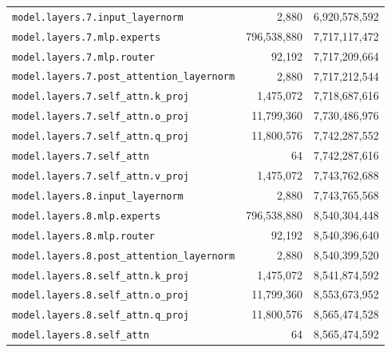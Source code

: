 \documentclass[10pt,a4paper]{article}
\theoremstyle{definition}
\begin{document}
\begin{appendices}
\begin{longtable}{p{9.5cm}rr}
\texttt{model.\allowbreak{}layers.\allowbreak{}7.\allowbreak{}input\_layernorm} & 2,880 & 6,920,578,592 \\
\texttt{model.\allowbreak{}layers.\allowbreak{}7.\allowbreak{}mlp.\allowbreak{}experts} & 796,538,880 & 7,717,117,472 \\
\texttt{model.\allowbreak{}layers.\allowbreak{}7.\allowbreak{}mlp.\allowbreak{}router} & 92,192 & 7,717,209,664 \\
\texttt{model.\allowbreak{}layers.\allowbreak{}7.\allowbreak{}post\_attention\_layernorm} & 2,880 & 7,717,212,544 \\
\texttt{model.\allowbreak{}layers.\allowbreak{}7.\allowbreak{}self\_attn.\allowbreak{}k\_proj} & 1,475,072 & 7,718,687,616 \\
\texttt{model.\allowbreak{}layers.\allowbreak{}7.\allowbreak{}self\_attn.\allowbreak{}o\_proj} & 11,799,360 & 7,730,486,976 \\
\texttt{model.\allowbreak{}layers.\allowbreak{}7.\allowbreak{}self\_attn.\allowbreak{}q\_proj} & 11,800,576 & 7,742,287,552 \\
\texttt{model.\allowbreak{}layers.\allowbreak{}7.\allowbreak{}self\_attn} & 64 & 7,742,287,616 \\
\texttt{model.\allowbreak{}layers.\allowbreak{}7.\allowbreak{}self\_attn.\allowbreak{}v\_proj} & 1,475,072 & 7,743,762,688 \\
\texttt{model.\allowbreak{}layers.\allowbreak{}8.\allowbreak{}input\_layernorm} & 2,880 & 7,743,765,568 \\
\texttt{model.\allowbreak{}layers.\allowbreak{}8.\allowbreak{}mlp.\allowbreak{}experts} & 796,538,880 & 8,540,304,448 \\
\texttt{model.\allowbreak{}layers.\allowbreak{}8.\allowbreak{}mlp.\allowbreak{}router} & 92,192 & 8,540,396,640 \\
\texttt{model.\allowbreak{}layers.\allowbreak{}8.\allowbreak{}post\_attention\_layernorm} & 2,880 & 8,540,399,520 \\
\texttt{model.\allowbreak{}layers.\allowbreak{}8.\allowbreak{}self\_attn.\allowbreak{}k\_proj} & 1,475,072 & 8,541,874,592 \\
\texttt{model.\allowbreak{}layers.\allowbreak{}8.\allowbreak{}self\_attn.\allowbreak{}o\_proj} & 11,799,360 & 8,553,673,952 \\
\texttt{model.\allowbreak{}layers.\allowbreak{}8.\allowbreak{}self\_attn.\allowbreak{}q\_proj} & 11,800,576 & 8,565,474,528 \\
\texttt{model.\allowbreak{}layers.\allowbreak{}8.\allowbreak{}self\_attn} & 64 & 8,565,474,592 \\

\end{longtable}
\end{appendices}
\end{document}
